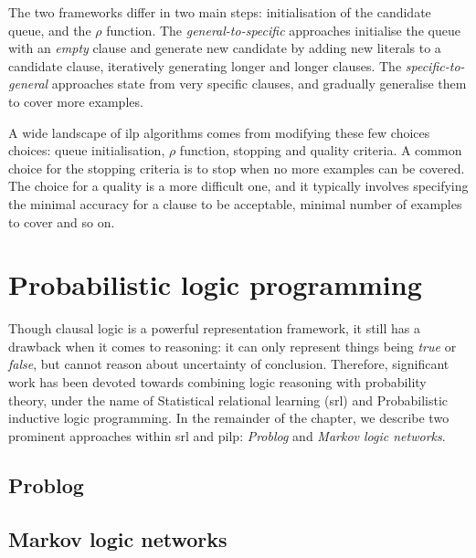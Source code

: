 The two frameworks differ in two main steps: initialisation of the candidate queue, and the $\rho$ function.
The \textit{general-to-specific} approaches initialise the queue with an \textit{empty} clause and generate new candidate by adding new literals to a candidate clause, iteratively generating longer and longer clauses.
The \textit{specific-to-general} approaches state from very specific clauses, and gradually generalise them to cover more examples.




A wide landscape of \gls{ilp} algorithms comes from modifying these few choices choices: queue initialisation, $\rho$ function, stopping and quality criteria.
A common choice for the stopping criteria is to stop when no more examples can be covered.
The choice for a quality is a more difficult one, and it typically involves specifying the minimal accuracy for a clause to be acceptable, minimal number of examples to cover and so on.








\section{Probabilistic logic programming}





Though clausal logic is a powerful representation framework, it still has a drawback when it comes to reasoning: it can only represent things being \textit{true} or \textit{false}, but cannot reason about uncertainty of conclusion.
Therefore, significant work has been devoted towards combining logic reasoning with probability theory, under the name of Statistical relational learning (\gls{srl}) and Probabilistic inductive logic programming.
In the remainder of the chapter, we describe two prominent approaches within \gls{srl} and \gls{pilp}: \textit{Problog} and \textit{Markov logic networks}.



\subsection{Problog}




\subsection{Markov logic networks}












\cleardoublepage

